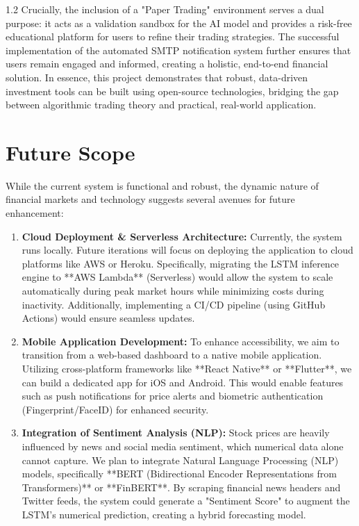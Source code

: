 \documentclass[12pt, a4paper]{report}
\begin{document}
\begin{spacing}{1.2}
Crucially, the inclusion of a "Paper Trading" environment serves a dual purpose: it acts as a validation sandbox for the AI model and provides a risk-free educational platform for users to refine their trading strategies. The successful implementation of the automated SMTP notification system further ensures that users remain engaged and informed, creating a holistic, end-to-end financial solution. In essence, this project demonstrates that robust, data-driven investment tools can be built using open-source technologies, bridging the gap between algorithmic trading theory and practical, real-world application.

\section{Future Scope}
While the current system is functional and robust, the dynamic nature of financial markets and technology suggests several avenues for future enhancement:
\vspace{1cm}

\begin{enumerate}
    \item \textbf{Cloud Deployment \& Serverless Architecture:} 
    Currently, the system runs locally. Future iterations will focus on deploying the application to cloud platforms like AWS or Heroku. Specifically, migrating the LSTM inference engine to **AWS Lambda** (Serverless) would allow the system to scale automatically during peak market hours while minimizing costs during inactivity. Additionally, implementing a CI/CD pipeline (using GitHub Actions) would ensure seamless updates.

    \item \textbf{Mobile Application Development:} 
    To enhance accessibility, we aim to transition from a web-based dashboard to a native mobile application. Utilizing cross-platform frameworks like **React Native** or **Flutter**, we can build a dedicated app for iOS and Android. This would enable features such as push notifications for price alerts and biometric authentication (Fingerprint/FaceID) for enhanced security.

    \item \textbf{Integration of Sentiment Analysis (NLP):} 
    Stock prices are heavily influenced by news and social media sentiment, which numerical data alone cannot capture. We plan to integrate Natural Language Processing (NLP) models, specifically **BERT (Bidirectional Encoder Representations from Transformers)** or **FinBERT**. By scraping financial news headers and Twitter feeds, the system could generate a "Sentiment Score" to augment the LSTM's numerical prediction, creating a hybrid forecasting model.


\end{enumerate}
\end{spacing}
\end{document}
